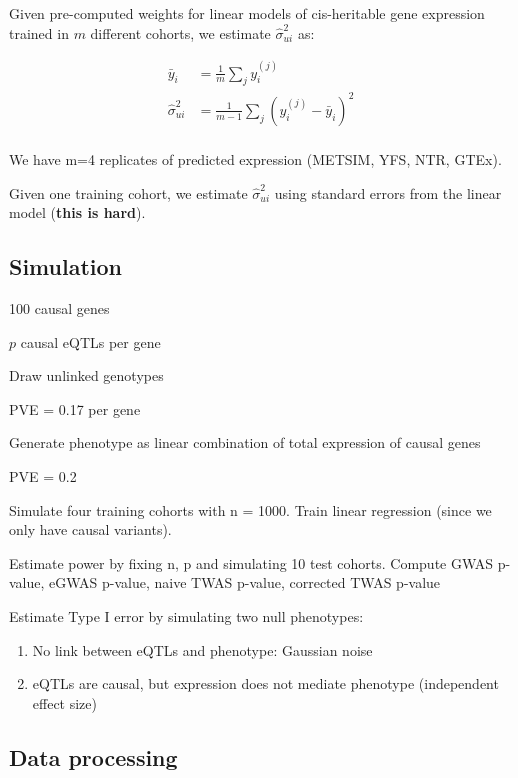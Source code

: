 \documentclass[11pt]{article}
\begin{document}
Given pre-computed weights for linear models of cis-heritable gene
expression trained in \(m\) different cohorts, we estimate \(\hat\sigma_{ui}^2\) as:

\begin{align*}
  \bar y_i &= \frac{1}{m} \sum_j y_i^{(j)}\\
  \hat\sigma_{ui}^2 &= \frac{1}{m - 1} \sum_j (y_i^{(j)} - \bar y_i)^2\\
\end{align*}

We have m=4 replicates of predicted expression (METSIM, YFS, NTR, GTEx).

Given one training cohort, we estimate \(\hat\sigma_{ui}^2\) using standard
errors from the linear model (\textbf{this is hard}).

\subsection{Simulation}

100 causal genes

\(p\) causal eQTLs per gene

Draw unlinked genotypes

PVE = 0.17 per gene

Generate phenotype as linear combination of total expression of causal genes

PVE = 0.2

Simulate four training cohorts with n = 1000. Train linear regression (since we
only have causal variants).

Estimate power by fixing n, p and simulating 10 test cohorts. Compute GWAS
p-value, eGWAS p-value, naive TWAS p-value, corrected TWAS p-value

Estimate Type I error by simulating two null phenotypes:

\begin{enumerate}
\item No link between eQTLs and phenotype: Gaussian noise
\item eQTLs are causal, but expression does not mediate phenotype (independent
effect size)
\end{enumerate}

\subsection{Data processing}

\clearpage
\printbibliography
\end{document}
